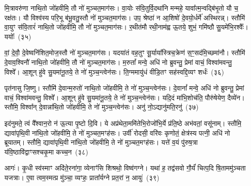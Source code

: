 मि॒त्रावरु॑णा नाथि॒तो जो॑हवीमि॒ तौ नो॑ मुञ्चत॒माग॑सः। वा॒योः स॑वि॒तुर्वि॒दथा॑नि मन्महे॒ यावा᳚त्म॒न्वद्बि॑भृ॒तो यौ च॒ रक्ष॑तः। यौ विश्व॑स्य परि॒भू ब॑भू॒वतु॒स्तौ नो॑ मुञ्चत॒माग॑सः। उप॒ श्रेष्ठा॑ न आ॒शिषो॑ दे॒वयो॒र्धर्मे॑ अस्थिरन्न्। स्तौमि॑ वा॒युꣳ स॑वि॒तारं॑ नाथि॒तो जो॑हवीमि॒ तौ नो॑ मुञ्चत॒माग॑सः। र॒थीत॑मौ रथी॒नाम॑ह्व ऊ॒तये॒ शुभं॒ गमि॑ष्ठौ सु॒यमे॑भि॒रश्वैः᳚। ययोः᳚~(३५)

वां॒ दे॒वौ॒ दे॒वेष्वनि॑शित॒मोज॒स्तौ नो॑ मुञ्चत॒माग॑सः। यदया॑तं वह॒तुꣳ सू॒र्याया᳚स्त्रिच॒क्रेण॑ स॒ꣳ॒सद॑मि॒च्छमा॑नौ। स्तौमि॑ दे॒वाव॒श्विनौ॑ नाथि॒तो जो॑हवीमि॒ तौ नो॑ मुञ्चत॒माग॑सः। म॒रुतां᳚ मन्वे॒ अधि॑ नो ब्रुवन्तु॒ प्रेमां वाचं॒ विश्वा॑मवन्तु॒ विश्वे᳚। आ॒शून् हु॑वे सु॒यमा॑नू॒तये॒ ते नो॑ मुञ्च॒न्त्वेन॑सः। ति॒ग्ममायु॑धं वीडि॒तꣳ सह॑स्वद्दि॒व्यꣳ शर्धः॑~(३६)

पृत॑नासु जि॒ष्णु। स्तौमि॑ दे॒वान्म॒रुतो॑ नाथि॒तो जो॑हवीमि॒ ते नो॑ मुञ्च॒न्त्वेन॑सः। दे॒वानां᳚ मन्वे॒ अधि॑ नो ब्रुवन्तु॒ प्रेमां वाचं॒ विश्वा॑मवन्तु॒ विश्वे᳚। आ॒शून् हु॑वे सु॒यमा॑नू॒तये॒ ते नो॑ मुञ्च॒न्त्वेन॑सः। यदि॒दं मा॑भि॒शोच॑ति॒ पौरु॑षेयेण॒ दैव्ये॑न। स्तौमि॒ विश्वा᳚न् दे॒वान्ना॑थि॒तो जो॑हवीमि॒ ते नो॑ मुञ्च॒न्त्वेन॑सः। अनु॑ नो॒\-ऽद्यानु॑मति॒रनु॑~(३७)

इद॑नुमते॒ त्वं वै᳚श्वान॒रो न॑ ऊ॒त्या पृ॒ष्टो दि॒वि। ये अप्र॑थेता॒ममि॑तेभि॒रोजो॑भि॒र्ये प्र॑ति॒ष्ठे अभ॑वतां॒ वसू॑नाम्। स्तौमि॒ द्यावा॑पृथि॒वी ना॑थि॒तो जो॑हवीमि॒ ते नो॑ मुञ्चत॒मꣳह॑सः। उर्वी॑ रोदसी॒ वरि॑वः कृणोतं॒ क्षेत्र॑स्य पत्नी॒ अधि॑ नो ब्रूयातम्। स्तौमि॒ द्यावा॑पृथि॒वी ना॑थि॒तो जो॑हवीमि॒ ते नो॑ मुञ्चत॒मꣳह॑सः। यत्ते॑ व॒यं पु॑रुष॒त्रा य॑वि॒ष्ठावि॑द्वाꣳसश्चकृ॒मा कच्च॒न~(३८)

आगः॑। कृ॒धी स्व॑स्माꣳ अदि॑ते॒रना॑गा॒ व्येनाꣳ॑सि शिश्रथो॒ विष्व॑गग्ने। यथा॑ ह॒ तद्व॑सवो गौ॒र्यं॑ चित्प॒दि षि॒ताममु॑ञ्चता यजत्राः। ए॒वा त्वम॒स्मत्प्र मु॑ञ्चा॒ व्यꣳहः॒ प्राता᳚र्यग्ने प्रत॒रां न॒ आयुः॑~(३९)


{\anuvakamend[{गन्ता॑ दू॒षय॒न्थ्स्तौमि॒ ययोः॒ शर्धो\-ऽनु॑मति॒रनु॑ च॒न चतु॑स्त्रिꣳशच्च}]}%

{\anuvakamend[{अ॒ग्निष्ट्वा॑ वा॒मश्वो॒ द्विच॑त्वारिꣳशच्च}]}%
